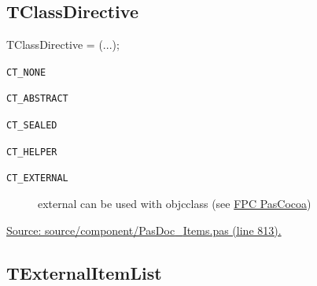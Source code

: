 \documentclass{report}
\newif\ifpdf
\begin{document}
\subsection*{TClassDirective}
\fi
\label{PasDoc_Items-TClassDirective}
\begin{list}{}{
\setlength{\itemindent}{0cm}
\setlength{\listparindent}{0cm}
\setlength{\leftmargin}{\evensidemargin}
\addtolength{\leftmargin}{\tmplength}
\settowidth{\labelsep}{X}
\addtolength{\leftmargin}{\labelsep}
\setlength{\labelwidth}{\tmplength}
}
\item[\textbf{Declaration}\hfill]
\ifpdf
\begin{flushleft}
\fi
\begin{ttfamily}
TClassDirective = (...);\end{ttfamily}

\ifpdf
\end{flushleft}
\fi

\par
\item[\textbf{Description}]
 \item[\textbf{Values}]
\begin{description}
\item[\texttt{CT{\_}NONE}] \label{PasDoc_Items-CT_NONE}
\index{}
 
\item[\texttt{CT{\_}ABSTRACT}] \label{PasDoc_Items-CT_ABSTRACT}
\index{}
 
\item[\texttt{CT{\_}SEALED}] \label{PasDoc_Items-CT_SEALED}
\index{}
 
\item[\texttt{CT{\_}HELPER}] \label{PasDoc_Items-CT_HELPER}
\index{}
 
\item[\texttt{CT{\_}EXTERNAL}] \label{PasDoc_Items-CT_EXTERNAL}
\index{}
external can be used with objcclass (see \href{https://wiki.freepascal.org/FPC_PasCocoa}{FPC PasCocoa})
\end{description}
\par
\href{https://github.com/pasdoc/pasdoc/blob/master/source/component/PasDoc_Items.pas#L813}{Source: source/component/PasDoc{\_}Items.pas (line 813).}

\end{list}
\ifpdf
\subsection*{\large{\textbf{TExternalItemList}}\normalsize\hspace{1ex}\hrulefill}
\else
\end{document}
